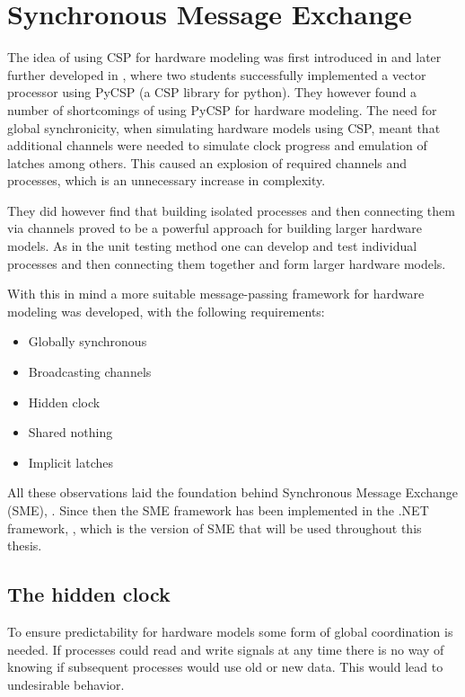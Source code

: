 \section{Synchronous Message Exchange}
    The idea of using CSP for hardware modeling was first introduced in \citet{BPUSimulator2013} and later further developed in \cite{PyCSPFPGA}, where two students successfully implemented a vector processor using PyCSP (a CSP library for python). They however found a number of shortcomings of using PyCSP for hardware modeling. The need for global synchronicity, when simulating hardware models using CSP, meant that additional channels were needed to simulate clock progress and emulation of latches among others. This caused an explosion of required channels and processes, which is an unnecessary increase in complexity.
    
    They did however find that building isolated processes and then connecting them via channels proved to be a powerful approach for building larger hardware models. As in the unit testing method one can develop and test individual processes and then connecting them together and form larger hardware models.
    
    With this in mind a more suitable message-passing framework for hardware modeling was developed, with the following requirements:
    
    \begin{itemize}
        \item Globally synchronous
        \item Broadcasting channels
        \item Hidden clock
        \item Shared nothing
        \item Implicit latches
    \end{itemize} 
    
    All these observations laid the foundation behind Synchronous Message Exchange (SME),  \citet{vinter2014synchronous}. 
    Since then the SME framework has been implemented in the .NET framework, \citet{skovhede2016building}, which is the version of SME that will be used throughout this thesis.
    
    \subsection{The hidden clock}
        To ensure predictability for hardware models some form of global coordination is needed. If processes could read and write signals at any time there is no way of knowing if subsequent processes would use old or new data. This would lead to undesirable behavior.
        
